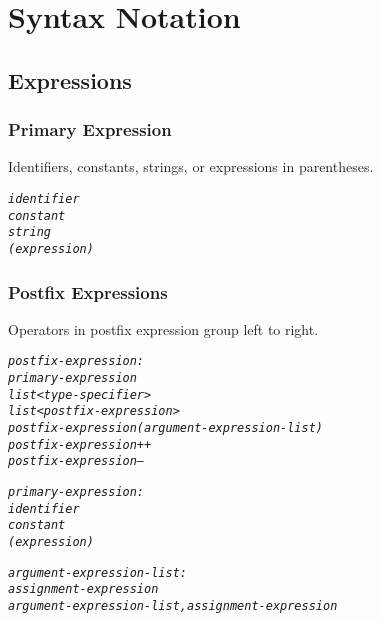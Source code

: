 \documentclass[12pt]{report}
\begin{document}
\section{Syntax Notation}

\subsection{Expressions}

\subsubsection{Primary Expression}

Identifiers, constants, strings, or expressions in parentheses.
\begin{alltt}
            \textit{identifier}
            \textit{constant}
            \textit{string}
            \textit{( expression )}
\end{alltt}

\subsubsection{Postfix Expressions}

Operators in postfix expression group left to right.
\begin{alltt}
         \textit{postfix-expression:}
              \textit{primary-expression}
              \textit{list<type-specifier>}
              \textit{list<postfix-expression>}
              \textit{postfix-expression ( argument-expression-list )}
              \textit{postfix-expression ++}
              \textit{postfix-expression --}
              
         \textit{primary-expression:}
              \textit{identifier}
              \textit{constant}
              \textit{( expression )}
              
         \textit{argument-expression-list:}
              \textit{assignment-expression}
              \textit{argument-expression-list , assignment-expression}
\end{alltt}
\end{document}
